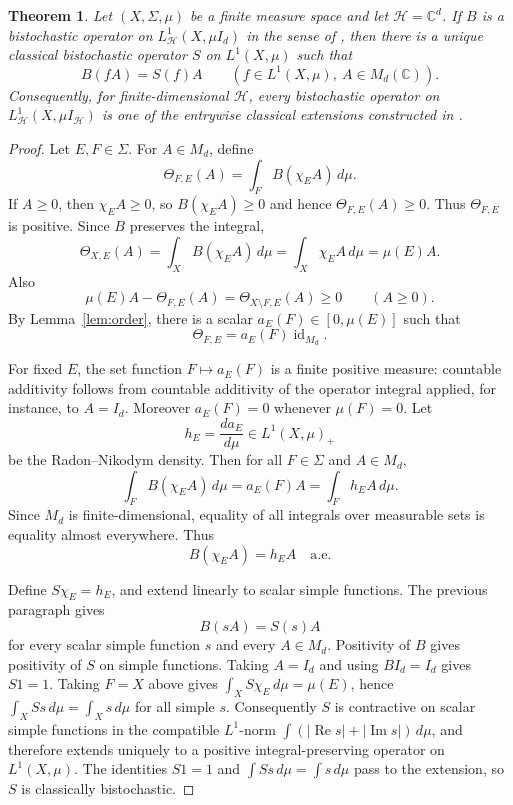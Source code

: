 \documentclass[11pt]{article}
\newtheorem{theorem}{Theorem}
\DeclareMathOperator{\id}{id}
\newcommand{\HH}{\mathcal H}
\begin{document}
\begin{theorem}\label{thm:finite}
Let \((X,\Sigma,\mu)\) be a finite measure space and let
\(\HH=\mathbb C^d\).  If \(B\) is a bistochastic operator on
\(L^1_{\HH}(X,\mu I_d)\) in the sense of \cite{PR}, then there is a unique
classical bistochastic operator \(S\) on \(L^1(X,\mu)\) such that
\[
        B(fA)=S(f)A
        \qquad
        (f\in L^1(X,\mu),\ A\in M_d(\mathbb C)).
\]
Consequently, for finite-dimensional \(\HH\), every bistochastic operator on
\(L^1_{\HH}(X,\mu I_{\HH})\) is one of the entrywise classical extensions
constructed in \cite[Theorem 5.5]{PR}.
\end{theorem}

\begin{proof}
Let \(E,F\in\Sigma\).  For \(A\in M_d\), define
\[
        \Theta_{F,E}(A)=\int_F B(\chi_E A)\,d\mu .
\]
If \(A\geq 0\), then \(\chi_EA\geq0\), so \(B(\chi_EA)\geq0\) and hence
\(\Theta_{F,E}(A)\geq0\).  Thus \(\Theta_{F,E}\) is positive.  Since \(B\)
preserves the integral,
\[
        \Theta_{X,E}(A)
        =\int_X B(\chi_EA)\,d\mu
        =\int_X \chi_E A\,d\mu
        =\mu(E)A .
\]
Also
\[
        \mu(E)A-\Theta_{F,E}(A)=\Theta_{X\setminus F,E}(A)\geq0
        \qquad(A\geq0).
\]
By Lemma~\ref{lem:order}, there is a scalar \(a_E(F)\in[0,\mu(E)]\) such that
\[
        \Theta_{F,E}=a_E(F)\id_{M_d}.
\]

For fixed \(E\), the set function \(F\mapsto a_E(F)\) is a finite positive
measure: countable additivity follows from countable additivity of the
operator integral applied, for instance, to \(A=I_d\).  Moreover
\(a_E(F)=0\) whenever \(\mu(F)=0\).  Let
\[
        h_E=\frac{d a_E}{d\mu}\in L^1(X,\mu)_+
\]
be the Radon--Nikodym density.  Then for all \(F\in\Sigma\) and \(A\in M_d\),
\[
        \int_F B(\chi_EA)\,d\mu
        =a_E(F)A
        =
        \int_F h_EA\,d\mu .
\]
Since \(M_d\) is finite-dimensional, equality of all integrals over measurable
sets is equality almost everywhere.  Thus
\[
        B(\chi_EA)=h_EA\quad\text{a.e.}
\]

Define \(S\chi_E=h_E\), and extend linearly to scalar simple functions.  The
previous paragraph gives
\[
        B(sA)=S(s)A
\]
for every scalar simple function \(s\) and every \(A\in M_d\).  Positivity of
\(B\) gives positivity of \(S\) on simple functions.  Taking \(A=I_d\) and
using \(B I_d=I_d\) gives \(S1=1\).  Taking \(F=X\) above gives
\(\int_X S\chi_E\,d\mu=\mu(E)\), hence \(\int_X Ss\,d\mu=\int_Xs\,d\mu\) for
all simple \(s\).  Consequently \(S\) is contractive on scalar simple
functions in the compatible \(L^1\)-norm
\(\int(|\operatorname{Re}s|+|\operatorname{Im}s|)\,d\mu\), and therefore
extends uniquely to a positive integral-preserving operator on \(L^1(X,\mu)\).
The identities \(S1=1\) and \(\int Ss\,d\mu=\int s\,d\mu\) pass to the
extension, so \(S\) is classically bistochastic.


\end{proof}
\end{document}
